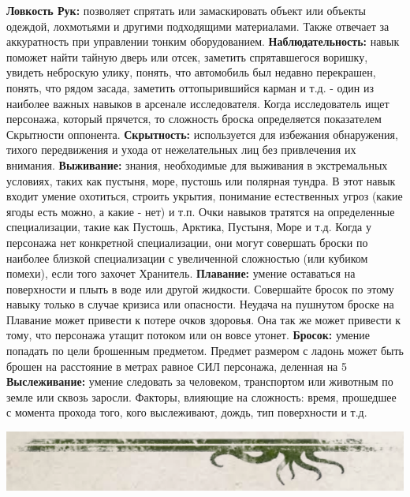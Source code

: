 \documentclass[letterpaper,twocolumn,openany, twoside, 11pt, usenames]{cocbook}
\begin{document}
\begin{fullcocpaperbox}{}{}
\begin{multicols}{3}
  \smallbreak
  \textbf{Ловкость Рук:} позволяет спрятать или замаскировать объект или объекты одеждой, лохмотьями и другими подходящими материалами. Также отвечает за аккуратность при управлении тонким оборудованием.
  \smallbreak
  \textbf{Наблюдательность:} навык поможет найти тайную дверь или отсек, заметить спрятавшегося воришку, увидеть неброскую улику, понять, что автомобиль был недавно перекрашен, понять, что рядом засада, заметить оттопырившийся карман и т.д. - один из наиболее важных навыков в арсенале исследователя. Когда исследователь ищет персонажа, который прячется, то сложность броска определяется показателем Скрытности оппонента.
  \smallbreak
  \textbf{Скрытность:} используется для избежания обнаружения, тихого передвижения и ухода от нежелательных лиц без привлечения их внимания.
  \smallbreak
  \textbf{Выживание:} знания, необходимые для выживания в экстремальных условиях, таких как пустыня, море, пустошь или полярная тундра. В этот навык входит умение охотиться, строить укрытия, понимание естественных угроз (какие ягоды есть можно, а какие - нет) и т.п. Очки навыков тратятся на определенные специализации, такие как Пустошь, Арктика, Пустыня, Море и т.д. Когда у персонажа нет конкретной специализации, они могут совершать броски по наиболее близкой специализации с увеличенной сложностью (или кубиком помехи), если того захочет Хранитель.
  \smallbreak
  \textbf{Плавание:} умение оставаться на поверхности и плыть в воде или другой жидкости. Совершайте бросок по этому навыку только в случае кризиса или опасности. Неудача на пушнутом броске на Плавание может привести к потере очков здоровья. Она так же может привести к тому, что персонажа утащит потоком или он вовсе утонет.
  \smallbreak
  \textbf{Бросок:} умение попадать по цели брошенным предметом. Предмет размером с ладонь может быть брошен на расстояние в метрах равное СИЛ персонажа, деленная на 5
  \smallbreak
  \textbf{Выслеживание:} умение следовать за человеком, транспортом или животным по земле или сквозь заросли. Факторы, влияющие на сложность: время, прошедшее с момента прохода того, кого выслеживают, дождь, тип поверхности и т.д.
  \end{multicols}
  \includegraphics[width=\linewidth]{img/bottom.png}
\end{fullcocpaperbox}
\end{document}
